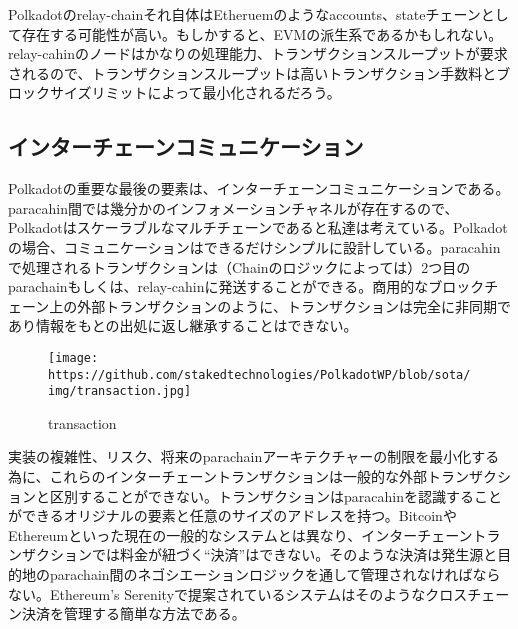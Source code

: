 Polkadotのrelay-chainそれ自体はEtheruemのようなaccounts、stateチェーンとして存在する可能性が高い。もしかすると、EVMの派生系であるかもしれない。relay-cahinのノードはかなりの処理能力、トランザクションスループットが要求されるので、トランザクションスループットは高いトランザクション手数料とブロックサイズリミットによって最小化されるだろう。

\hypertarget{ux30a4ux30f3ux30bfux30fcux30c1ux30a7ux30fcux30f3ux30b3ux30dfux30e5ux30cbux30b1ux30fcux30b7ux30e7ux30f3}{%
\subsection{インターチェーンコミュニケーション}\label{ux30a4ux30f3ux30bfux30fcux30c1ux30a7ux30fcux30f3ux30b3ux30dfux30e5ux30cbux30b1ux30fcux30b7ux30e7ux30f3}}

Polkadotの重要な最後の要素は、インターチェーンコミュニケーションである。
paracahin間では幾分かのインフォメーションチャネルが存在するので、Polkadotはスケーラブルなマルチチェーンであると私達は考えている。Polkadotの場合、コミュニケーションはできるだけシンプルに設計している。paracahinで処理されるトランザクションは（Chainのロジックによっては）2つ目のparachainもしくは、relay-cahinに発送することができる。商用的なブロックチェーン上の外部トランザクションのように、トランザクションは完全に非同期であり情報をもとの出処に返し継承することはできない。

\begin{figure}
\centering
\texttt{[image: https://github.com/stakedtechnologies/PolkadotWP/blob/sota/img/transaction.jpg]}
\caption{transaction}
\end{figure}

実装の複雑性、リスク、将来のparachainアーキテクチャーの制限を最小化する為に、これらのインターチェーントランザクションは一般的な外部トランザクションと区別することができない。トランザクションはparacahinを認識することができるオリジナルの要素と任意のサイズのアドレスを持つ。BitcoinやEthereumといった現在の一般的なシステムとは異なり、インターチェーントランザクションでは料金が紐づく``決済''はできない。そのような決済は発生源と目的地のparachain間のネゴシエーションロジックを通して管理されなければならない。Ethereum's
Serenityで提案されているシステムはそのようなクロスチェーン決済を管理する簡単な方法である。

